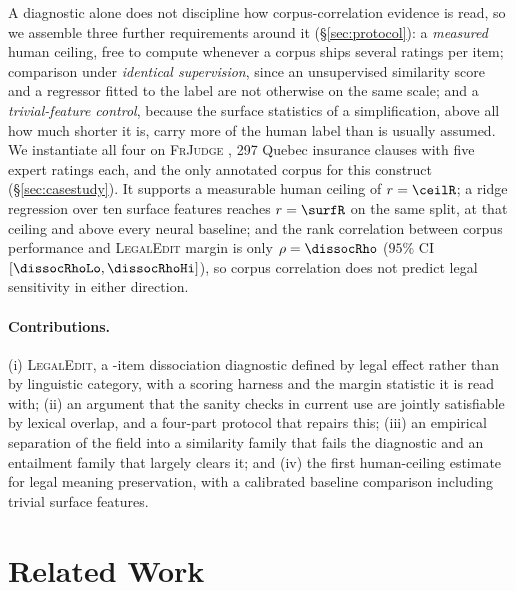 \documentclass[11pt]{article}
\begin{document}
A diagnostic alone does not discipline how corpus-correlation evidence is read,
so we assemble three further requirements around it (\S\ref{sec:protocol}): a
\emph{measured} human ceiling, free to compute whenever a corpus ships several
ratings per item; comparison under \emph{identical supervision}, since an
unsupervised similarity score and a regressor fitted to the label are not
otherwise on the same scale; and a \emph{trivial-feature control}, because the
surface statistics of a simplification, above all how much shorter it is, carry
more of the human label than is usually assumed. We instantiate all four on
\textsc{FrJudge} \citep{beauchemin2025judgebert}, 297 Quebec insurance clauses
with five expert ratings each, and the only annotated corpus for this construct
(\S\ref{sec:casestudy}). It supports a measurable human ceiling of $r=\ceilR$;
a ridge regression over ten surface features reaches $r=\surfR$ on the same
split, at that ceiling and above every neural baseline; and the rank correlation
between corpus performance and \textsc{LegalEdit} margin is only
$\rho=\dissocRho$ ($95\%$ CI $[\dissocRhoLo, \dissocRhoHi]$), so corpus
correlation does not predict legal sensitivity in either direction.

\paragraph{Contributions.}
(i) \textsc{LegalEdit}, a \numedits-item dissociation diagnostic defined by
legal effect rather than by linguistic category, with a scoring harness and the
margin statistic it is read with; (ii) an argument that the sanity checks in
current use are jointly satisfiable by lexical overlap, and a four-part protocol
that repairs this; (iii) an empirical separation of the field into a similarity
family that fails the diagnostic and an entailment family that largely clears
it; and (iv) the first human-ceiling estimate for legal meaning preservation,
with a calibrated baseline comparison including trivial surface features.

\section{Related Work}
\label{sec:related}
\end{document}

